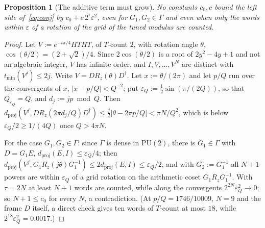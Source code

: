\documentclass[aps,prx,twocolumn,superscriptaddress,nofootinbib,longbibliography]{revtex4-2}
\theoremstyle{plain}
\newtheorem{proposition}{Proposition}
\theoremstyle{definition}
\theoremstyle{remark}
\newcommand{\dproj}{d_{\mathrm{proj}}}
\newcommand{\PU}{\mathrm{PU}(2)}
\begin{document}
\begin{proposition}[The additive term must grow]\label{prop:cluster}
No constants $c_0,c$ bound the left side of~\eqref{eq:conj} by $c_0+c\,2^\tau\varepsilon^2$, even for $G_1,G_2\in\Gamma$ and even when only the words within $\varepsilon$ of a rotation of the grid of the tuned modulus are counted.
\end{proposition}
\begin{proof}
Let $V:=e^{-i\pi/4}HTHT$, of $T$-count $2$, with rotation angle $\theta$, $\cos(\theta/2)=(2+\sqrt2)/4$. Since $2\cos(\theta/2)$ is a root of $2y^2-4y+1$ and not an algebraic integer, $V$ has infinite order, and $I,V,\dots,V^N$ are distinct with $t_{\min}(V^j)\le2j$. Write $V=DR_z(\theta)D^\dagger$. Let $x:=\theta/(2\pi)$ and let $p/Q$ run over the convergents of $x$, $|x-p/Q|<Q^{-2}$; put $\varepsilon_Q:=\tfrac12\sin(\pi/(2Q))$, so that $Q_{\varepsilon_Q}=Q$, and $d_j:=jp\bmod Q$. Then $\dproj(V^j,DR_z(2\pi d_j/Q)D^\dagger)\le\tfrac j2|\theta-2\pi p/Q|<\pi N/Q^2$, which is below $\varepsilon_Q/2\ge1/(4Q)$ once $Q>4\pi N$. 

For the case $G_1,G_2\in\Gamma$: since $\Gamma$ is dense in $\PU$, there is $G_1\in\Gamma$ with $D=G_1E$, $\dproj(E,I)\le\varepsilon_Q/4$; then $\dproj(V^j,G_1R_z(j\theta)G_1^{-1})\le2\dproj(E,I)\le\varepsilon_Q/2$, and with $G_2:=G_1^{-1}$ all $N+1$ powers are within $\varepsilon_Q$ of a grid rotation on the arithmetic coset $G_1R_zG_1^{-1}$. With $\tau=2N$ at least $N+1$ words are counted, while along the convergents $2^{2N}\varepsilon_Q^2\to0$; so $N+1\le c_0$ for every $N$, a contradiction. (At $p/Q=1746/10009$, $N=9$ and the frame $D$ itself, a direct check gives ten words of $T$-count at most $18$, while $2^{18}\varepsilon_Q^2=0.0017$.)
\end{proof}
\end{document}
